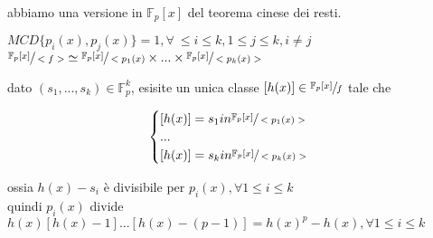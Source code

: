 \documentclass[a4paper,12pt]{article}
\theoremstyle{def}
\theoremstyle{prop}
\theoremstyle{esempio}
\theoremstyle{dimostrazione}
\theoremstyle{teo}
\theoremstyle{osservazione}
\begin{document}
abbiamo una versione in \(\mathbb{F}_p[x]\) del teorema cinese dei resti.\\
\begin{center}
	\( MCD\{ p_i(x), p_j(x)\} = 1, \forall \ \leq i \leq k, 1 \leq j \leq k, i \neq j\)\\
	\(\sfrac{\mathbb{F}_p[x]}{<f>} \simeq \sfrac{\mathbb{F}_p[x]}{<p_1(x)} \times ... \times \sfrac{\mathbb{F}_p[x]}{<p_k(x)>}\)
\end{center}
dato \((s_1, ..., s_k) \in \mathbb{F}_p^k\), esisite un unica classe \([h(x)] \in \sfrac{\mathbb{F}_p[x]}{f}\) tale che
\begin{center}
	\[
		\begin{cases}
			[h(x)] = s_1 in  \sfrac{\mathbb{F}_p[x]}{<p_1(x)>} \\
			...                                                \\
			[h(x)] = s_k in \sfrac{\mathbb{F}_p[x]}{<p_k(x)>}
		\end{cases}
	\]
\end{center}
ossia \(h(x) - s_i\) è divisibile per \(p_i(x), \forall 1 \leq i \leq k\)\\
quindi \(p_i(x)\) divide \(h(x)[h(x) - 1] ... [h(x) - (p - 1)] = h(x)^p - h(x), \forall 1 \leq i \leq k\)\\

\newpage
\end{document}
